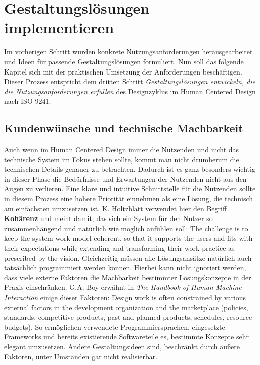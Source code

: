 \chapter{Gestaltungslösungen implementieren}
\label{chapter:implementation}

Im vorherigen Schritt wurden konkrete Nutzungsanforderungen herausgearbeitet
und Ideen für passende Gestaltungslösungen formuliert. Nun soll das folgende
Kapitel sich mit der praktischen Umsetzung der Anforderungen beschäftigen.
Dieser Prozess entspricht dem dritten Schritt \textit{Gestaltungslösungen
    entwickeln, die die Nutzungsanforderungen erfüllen} des Designzyklus im Human
Centered Design nach ISO 9241\cite{ISO9241}.

\section{Kundenwünsche und technische Machbarkeit}
Auch wenn im Human Centered Design immer die Nutzenden und nicht das technische
System im Fokus stehen sollte, kommt man nicht drumherum die technischen
Details genauer zu betrachten. Dadurch ist es ganz besonders wichtig in dieser
Phase die Bedürfnisse und Erwartungen der Nutzenden nicht aus den Augen zu
verlieren. Eine klare und intuitive Schnittstelle für die Nutzenden sollte in
diesem Prozess eine höhere Priorität einnehmen als eine Lösung, die technisch
am einfachsten umzusetzen ist. K. Holtzblatt verwendet hier den Begriff
\textbf{Kohärenz} und meint damit, das sich ein System für den Nutzer so
zusammenhängend und natürlich wie möglich anfühlen soll: \glqq{}The challenge
is to keep the system work model coherent, so that it supports the users and
fits with their expectations while extending and transforming their work
practice as prescribed by the vision.\grqq{}\cite{contextualDesign}
Gleichzeitig müssen alle Lösungsansätze natürlich auch tatsächlich programmiert
werden können. Hierbei kann nicht ignoriert werden, dass viele externe Faktoren
die Machbarkeit bestimmter Lösungskonzepte in der Praxis einschränken. G.A. Boy
erwähnt in \textit{The Handbook of Human-Machine Interaction} einige dieser
Faktoren: \glqq{}Design work is often constrained by various external factors
in the development organization and the marketplace (policies, standards,
competitive products, past and planned products, schedules, resource
budgets).\grqq\cite{HMI-HCD} So ermöglichen verwendete Programmiersprachen,
eingesetzte Frameworks und bereits existierende Softwareteile es, bestimmte
Konzepte sehr elegant umzusetzen. Andere Gestaltungsideen sind, beschränkt
durch äußere Faktoren, unter Umständen gar nicht realisierbar.\cite{HMI-HCD}

